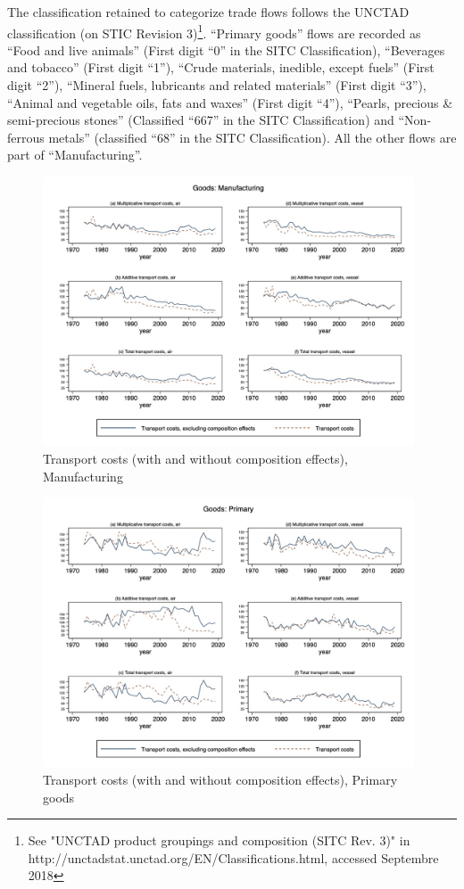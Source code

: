 \documentclass[11pt,twoside, authoryear]{elsarticle}
\begin{document}
The classification retained to categorize trade flows follows the UNCTAD classification (on STIC Revision 3)\footnote{See "UNCTAD product groupings and composition (SITC Rev. 3)" in http://unctadstat.unctad.org/EN/Classifications.html, accessed Septembre 2018}.
``Primary goods'' flows are recorded as ``Food and live animals'' (First digit ``0'' in the SITC Classification), ``Beverages and tobacco'' (First digit ``1''), ``Crude materials, inedible, except fuels'' (First digit ``2''), ``Mineral fuels, lubricants and related materials'' (First digit ``3''), ``Animal and vegetable oils, fats and waxes'' (First digit ``4''), ``Pearls, precious \& semi-precious stones'' (Classified ``667'' in the SITC Classification) and ``Non-ferrous metals'' (classified ``68'' in the SITC Classification).
All the other flows are part of ``Manufacturing''.


\begin{figure}[htbp]
\caption{Transport costs (with and without composition effects), Manufacturing}
\label{fig:totalTC_compeffects_excl_manuf}
\begin{center}
\includegraphics[height=8cm] {../graph_composition_manuf.jpg}
\end{center}
\end{figure}

\begin{figure}[htbp]
\caption{Transport costs (with and without composition effects), Primary goods}
\label{fig:totalTC_compeffects_excl_primary}
\begin{center}
\includegraphics[height=8cm]
{../graph_composition_primary.jpg}
\end{center}
\end{figure}
\end{document}
